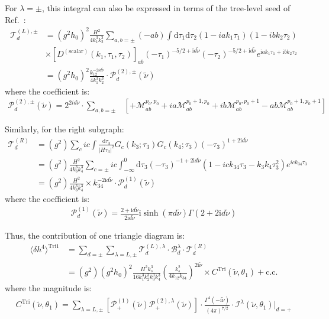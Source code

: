 \documentclass[a4paper,12pt]{article}
\def\di{{\mathrm{d}}}
\def\mc{\mathcal}
\def\la{\langle}\def\ra{\rangle}
\def\ii{\mathrm{i}}
\def\lam{\lambda}
\def\tn{\tilde\nu}
\begin{document}
For $\lambda=\pm$, this integral can also be expressed in terms of the tree-level seed of Ref.~\cite{qin_closed-form_2023}:
\begin{align}
    \mathcal{T}^{(L),\pm}_d 
    &= (g^2h_0)^2  
    \frac{H^2}{4k_1^3 k_2^3}
    \sum_{a,b=\pm} (-ab)
    \int \di \tau_1 \di \tau_2 
    (1-iak_1\tau_1)(1-ibk_2\tau_2)
    \nonumber \\
    &\times \left[D^{(\text{scalar})}(k_1,\tau_1,\tau_2)\right]_{ab} 
    (-\tau_1)^{-5/2+\ii d\tn}
    (-\tau_2)^{-5/2+\ii d\tn} 
    e^{\ii ak_1\tau_1 + \ii bk_2\tau_2} \\
    &= \left( g^2h_0\right)^2 
    \frac{k_{12}^{-2id\tn}}{4k_1^3 k_2^3} 
    \cdot \mathcal{P}_d^{(2),\pm}(\tn)
\end{align}
where the coefficient is:
\begin{align}
    \mathcal{P}_d^{(2),\pm}(\tn)
    = 2^{2id\tn} \cdot \sum_{a,b=\pm}
    &\left[ +{\mathcal{M}}_{ab}^{p_0,p_0}
    + ia {\mathcal{M}}_{ab}^{p_0+1,p_0}
    + ib {\mathcal{M}}_{ab}^{p_0,p_0+1}
    - ab {\mathcal{M}}_{ab}^{p_0+1,p_0+1} \right]
\end{align}

Similarly, for the right subgraph:
\begin{align}
    \mathcal{T}^{(R)}_d &= (g^2) \sum_c ic \int \frac{\di \tau_3}{|H \tau_3|^2} G_c(k_3;\tau_3) G_c(k_4;\tau_3) (-\tau_3)^{1+2\ii d\tn} \nonumber \\
    &= (g^2) \frac{H^2}{4k_3^3 k_4^3} \sum_{c=\pm} ic \int_{-\infty}^{0} \di \tau_3 (-\tau_3)^{-1+2\ii d\tn} (1 -ick_{34}\tau_3-k_3k_4\tau_3^2) e^{ick_{34}\tau_3} \nonumber \\
    &= (g^2) \frac{H^2}{4k_3^3 k_4^3} \times k_{34}^{-2\ii d\tn} \cdot \mathcal{P}^{(1)}_d(\tn)
\end{align}
where the coefficient is:
\begin{align}
    \mathcal{P}^{(1)}_d(\tn) = \frac{2+\ii d\tn}{2\ii d\tn} \ii\sinh(\pi d \tn) \Gamma(2+2\ii d\tn)
\end{align}

Thus, the contribution of one triangle diagram is:
\begin{align}
    \la \delta h^4 \ra^{\text{Tri1}} 
    &= \sum_{d=\pm} \sum_{\lambda=L,\pm} 
    \mc T^{(L),\lambda}_d  
    \cdot \mc B^{\lam}_d 
    \cdot \mc T^{(R)}_d \\
    &= (g^2)(g^2h_0)^2 
    \frac{H^2 k_s^3}{16 k_1^3 k_2^3 k_3^3 k_4^3} 
    \left( \frac{k_s^2}{4k_{12}k_{34}}\right)^{2\ii\tn} 
    \times C^{\text{Tri}}(\tn,\theta_1) + \text{c.c.}
\end{align}
where the magnitude is:
\begin{align}
    C^{\text{Tri}}(\tn,\theta_1) = 
    \sum_{\lam=L,\pm}
    [\mathcal{P}^{(1)}_+(\tn) \mc P^{(2),\lambda}_+(\tn) ]
    \cdot \frac{\Gamma^4(-\ii \tn)}{(4\pi)^{7/2}} \cdot 
    \mathcal{I}^{\lambda}(\tn,\theta_1)|_{d=+}
\end{align}
\end{document}
